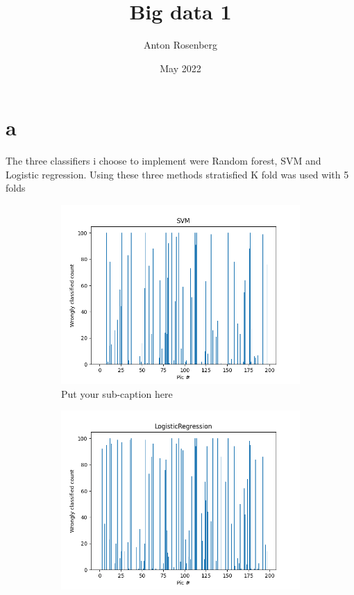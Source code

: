 \documentclass{article}
\title{Big data 1}
\author{Anton Rosenberg}
\date{May 2022}
\begin{document}
\maketitle
\newpage
\section{a}
The three classifiers i choose to implement were Random forest, SVM and Logistic regression. Using these three methods stratisfied K fold was used with 5 folds 
\begin{figure}[ht]
\begin{subfigure}{.33\textwidth}
  \centering
  \includegraphics[width=1\linewidth]{1a/SVM.png}  
  \caption{Put your sub-caption here}
  \label{fig:sub-first}
\end{subfigure}
\begin{subfigure}{.33\textwidth}
  \centering
  \includegraphics[width=1\linewidth]{1a/Logistic regression.png}  

\end{subfigure}
\end{figure}
\end{document}
